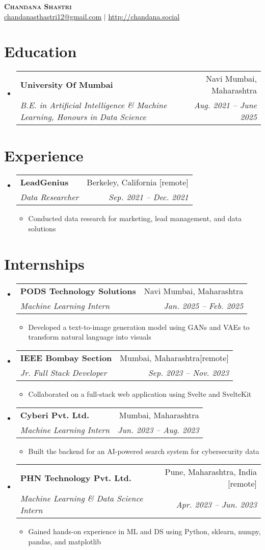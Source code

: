 \documentclass[letterpaper,11pt]{article}
\makeatletter
\newcommand{\resumeItem}[1]{
  \item\small{
    {#1 \vspace{-2pt}}
  }
}
\newcommand{\resumeSubheading}[4]{
  \vspace{-2pt}\item
    \begin{tabular*}{0.97\textwidth}[t]{l@{\extracolsep{\fill}}r}
      \textbf{#1} & #2 \\
      \textit{\small#3} & \textit{\small #4} \\
    \end{tabular*}\vspace{-7pt}
}
\newcommand{\resumeSubHeadingListStart}{\begin{itemize}[leftmargin=0.15in, label={}]}
\newcommand{\resumeSubHeadingListEnd}{\end{itemize}}
\newcommand{\resumeItemListStart}{\begin{itemize}}
\newcommand{\resumeItemListEnd}{\end{itemize}\vspace{-5pt}}
\makeatother
\begin{document}
\begin{center}
    \textbf{\Huge \scshape Chandana Shastri} \\ \vspace{1pt}
    \href{mailto:chandanasthastri12@gmail.com}{\underline{chandanasthastri12@gmail.com}} $|$ 
    \href{https://chandanas03.github.io/Portfolio/}{\underline{http://chandana.social}}
\end{center}

\section{Education}
  \resumeSubHeadingListStart
    \resumeSubheading
      {University Of Mumbai}{Navi Mumbai, Maharashtra}
      {B.E. in Artificial Intelligence \& Machine Learning, Honours in Data Science}{Aug. 2021 -- June 2025}

  \resumeSubHeadingListEnd

\section{Experience}
  \resumeSubHeadingListStart
    \resumeSubheading
      {LeadGenius}{Berkeley, California [remote]}
      {Data Researcher}{Sep. 2021 -- Dec. 2021}
      \resumeItemListStart
        \resumeItem{Conducted data research for marketing, lead management, and data solutions}
      \resumeItemListEnd
  \resumeSubHeadingListEnd

\section{Internships}
  \resumeSubHeadingListStart
    \resumeSubheading
      {PODS Technology Solutions}{Navi Mumbai, Maharashtra}
      {Machine Learning Intern}{Jan. 2025 -- Feb. 2025}
      \resumeItemListStart
        \resumeItem{Developed a text-to-image generation model using GANs and VAEs to transform natural language into visuals}
      \resumeItemListEnd
    \resumeSubheading
      {IEEE Bombay Section}{Mumbai, Maharashtra[remote]}
      {Jr. Full Stack Developer}{Sep. 2023 -- Nov. 2023}
      \resumeItemListStart
        \resumeItem{Collaborated on a full-stack web application using Svelte and SvelteKit}
      \resumeItemListEnd
    \resumeSubheading
      {Cyberi Pvt. Ltd.}{Mumbai, Maharashtra}
      {Machine Learning Intern}{Jun. 2023 -- Aug. 2023}
      \resumeItemListStart
        \resumeItem{Built the backend for an AI-powered search system for cybersecurity data}
      \resumeItemListEnd
    \resumeSubheading
      {PHN Technology Pvt. Ltd.}{Pune, Maharashtra, India [remote]}
      {Machine Learning \& Data Science Intern}{Apr. 2023 -- Jun. 2023}
      \resumeItemListStart
        \resumeItem{Gained hands-on experience in ML and DS using Python, sklearn, numpy, pandas, and matplotlib}
      \resumeItemListEnd
  \resumeSubHeadingListEnd
\end{document}
